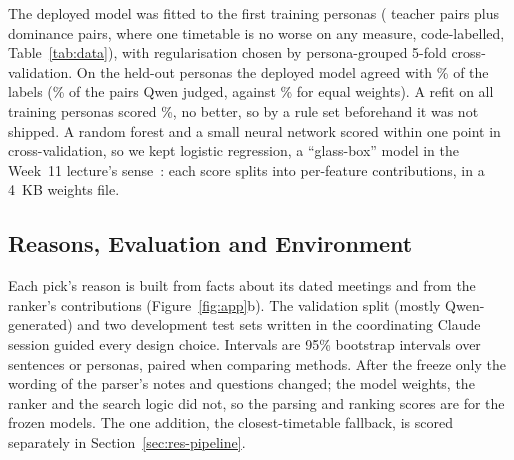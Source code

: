 The deployed model was fitted to the first \rDeployPersonas{} training personas (\rDeployTeacher{} teacher pairs plus \rDeployCode{} dominance pairs, where one timetable is no worse on any measure, code-labelled, Table~\ref{tab:data}), with regularisation chosen by persona-grouped 5-fold cross-validation. On the \sTestPersonas{} held-out personas the deployed model agreed with \rHeldOne\% of the labels (\rHeldTeacherLR\% of the pairs Qwen judged, against \rHeldTeacherEq\% for equal weights). A refit on all \sTrainPersonas{} training personas scored \rHeldTwo\%, no better, so by a rule set beforehand it was not shipped. A random forest and a small neural network scored within one point in cross-validation, so we kept logistic regression, a ``glass-box'' model in the Week~11 lecture's sense~\cite{engg2112_w11}: each score splits into per-feature contributions, in a 4~KB weights file.

\subsection{Reasons, Evaluation and Environment}\label{sec:explain}

Each pick's reason is built from facts about its dated meetings and from the ranker's contributions (Figure~\ref{fig:app}b). The validation split (mostly Qwen-generated) and two development test sets written in the coordinating Claude session guided every design choice. Intervals are 95\% bootstrap intervals over sentences or personas, paired when comparing methods. After the freeze only the wording of the parser's notes and questions changed; the model weights, the ranker and the search logic did not, so the parsing and ranking scores are for the frozen models. The one addition, the closest-timetable fallback, is scored separately in Section~\ref{sec:res-pipeline}.

